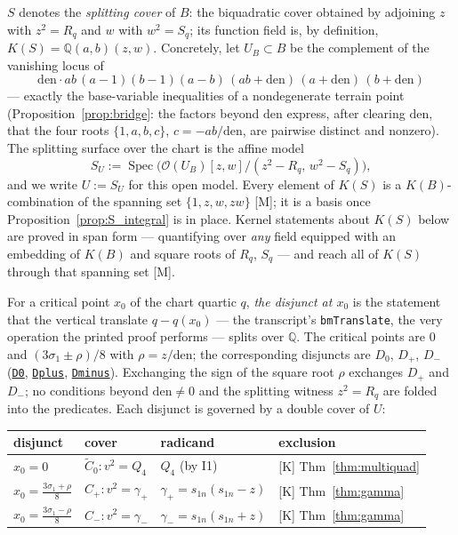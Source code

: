 \documentclass[11pt]{amsart}
\newcommand{\Q}{\mathbb{Q}}
\newcommand{\repourl}{https://github.com/hirokifukui/rd-quartics-classification}
\newcommand{\repotag}{v1.1.0}
\newcommand{\leanline}[3]{\href{\repourl/blob/\repotag/#1\#L#2}{\texttt{#3}}}
\begin{document}
$S$ denotes the \emph{splitting cover} of $B$: the biquadratic cover
obtained by adjoining $z$ with $z^{2}=R_{q}$ and $w$ with
$w^{2}=S_{q}$; its function field is, by definition,
$K(S)=\Q(a,b)(z,w)$.  Concretely, let $U_{B}\subset B$ be the complement of the vanishing
locus of
\[
\mathrm{den}\cdot ab\,(a-1)(b-1)(a-b)\,(ab+\mathrm{den})\,
(a+\mathrm{den})\,(b+\mathrm{den})
\]
--- exactly the base-variable inequalities of a nondegenerate terrain
point (Proposition~\ref{prop:bridge}: the factors beyond
$\mathrm{den}$ express, after clearing $\mathrm{den}$, that the four
roots $\{1,a,b,c\}$, $c=-ab/\mathrm{den}$, are pairwise distinct and
nonzero).  The splitting surface over the chart is the affine model
\[
S_{U}:=\operatorname{Spec}\bigl(\mathcal O(U_{B})[z,w]/
(z^{2}-R_{q},\,w^{2}-S_{q})\bigr),
\]
and we write $U:=S_{U}$ for this open model.  Every element of
$K(S)$ is a $K(B)$-combination of the spanning set $\{1,z,w,zw\}$ [M];
it is a basis once Proposition~\ref{prop:S_integral} is in place.
Kernel statements about $K(S)$ below are proved in span form ---
quantifying over \emph{any} field equipped with an embedding of $K(B)$
and square roots of $R_{q}$, $S_{q}$ --- and reach all of $K(S)$
through that spanning set [M].

For a critical point $x_{0}$ of the chart quartic $q$, \emph{the
disjunct at $x_{0}$} is the statement that the vertical translate
$q-q(x_{0})$ --- the transcript's \texttt{bmTranslate}, the very
operation the printed proof performs --- splits over $\Q$.  The
critical points are $0$ and $(3\sigma_{1}\pm\rho)/8$ with
$\rho=z/\mathrm{den}$; the corresponding disjuncts are $D_{0}$,
$D_{+}$, $D_{-}$
(\leanline{Gap/BMThm7Fibre.lean}{39}{D0},
\leanline{Gap/BMThm7Fibre.lean}{43}{Dplus},
\leanline{Gap/BMThm7Fibre.lean}{47}{Dminus}).  Exchanging the sign of
the square root $\rho$ exchanges $D_{+}$ and $D_{-}$; no conditions
beyond $\mathrm{den}\neq0$ and the splitting witness $z^{2}=R_{q}$ are
folded into the predicates.  Each disjunct is governed by a double
cover of $U$:

\begin{center}\small
\begin{tabular}{llll}
\toprule
disjunct & cover & radicand & exclusion \\
\midrule
$x_{0}=0$ & $\widetilde C_{0}\colon v^{2}=Q_{4}$ & $Q_{4}$ (by I1) &
[K] Thm~\ref{thm:multiquad} \\
$x_{0}=\tfrac{3\sigma_{1}+\rho}{8}$ & $C_{+}\colon v^{2}=\gamma_{+}$ &
$\gamma_{+}=s_{1n}(s_{1n}-z)$ & [K] Thm~\ref{thm:gamma} \\
$x_{0}=\tfrac{3\sigma_{1}-\rho}{8}$ & $C_{-}\colon v^{2}=\gamma_{-}$ &
$\gamma_{-}=s_{1n}(s_{1n}+z)$ & [K] Thm~\ref{thm:gamma} \\
\bottomrule
\end{tabular}
\end{center}
\end{document}
